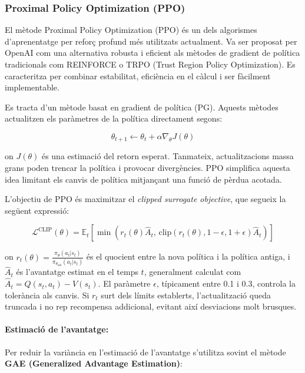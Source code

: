 \documentclass[12pt,a4paper,twoside]{book}
\begin{document}
\subsubsection{Proximal Policy Optimization (PPO)}

El mètode Proximal Policy Optimization (PPO) és un dels algorismes d'aprenentatge per reforç profund més utilitzats actualment. Va ser proposat per OpenAI com una alternativa robusta i eficient als mètodes de gradient de política tradicionals com REINFORCE o TRPO (Trust Region Policy Optimization)\cite{schulman2017}. Es caracteritza per combinar estabilitat, eficiència en el càlcul i ser fàcilment implementable.


Es tracta d'un mètode basat en gradient de política (PG). Aquests mètodes actualitzen els paràmetres de la política directament segons:

\begin{equation}
\theta_{t+1} \leftarrow \theta_t + \alpha \nabla_\theta J(\theta)
\end{equation}

on $J(\theta)$ és una estimació del retorn esperat. Tanmateix, actualitzacions massa grans poden trencar la política i provocar divergències. PPO simplifica aquesta idea limitant els canvis de política mitjançant una funció de pèrdua acotada.

L'objectiu de PPO és maximitzar el \textit{clipped surrogate objective}, que segueix la següent expressió:

\begin{equation}
\mathcal{L}^{\text{CLIP}}(\theta) = \mathbb{E}_t \left[ \min \left( r_t(\theta) \hat{A}_t, \, \text{clip}(r_t(\theta), 1 - \epsilon, 1 + \epsilon) \hat{A}_t \right) \right]
\end{equation}

on $r_t(\theta) = \frac{\pi_\theta(a_t | s_t)}{\pi_{\theta_{\text{old}}}(a_t | s_t)}$ és el quocient entre la nova política i la política antiga, i $\hat{A}_t$ és l'avantatge estimat en el temps $t$, generalment calculat com $\hat{A}_t = Q(s_t,a_t) - V(s_t)$. El paràmetre $\epsilon$, típicament entre 0.1 i 0.3, controla la tolerància als canvis. Si $r_t$ surt dels límits establerts, l'actualització queda truncada i no rep recompensa addicional, evitant així desviacions molt brusques.

\paragraph{Estimació de l'avantatge:}
Per reduir la variància en l'estimació de l'avantatge s'utilitza sovint el mètode \textbf{GAE (Generalized Advantage Estimation)}:
\end{document}
